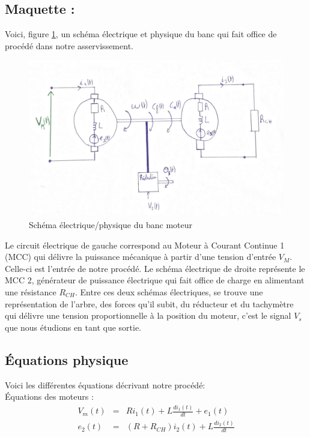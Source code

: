 \subsection{Maquette :}
Voici, figure \ref{fig:schema0}, un schéma électrique et physique du banc qui fait office de procédé dans notre asservissement.
\begin{figure}[!ht]
\centering
\includegraphics[width=.8\textwidth]{./I/images/schema0.png}
\caption{\label{fig:schema0}Schéma électrique/physique du banc moteur}
\end{figure}
Le circuit électrique de gauche correspond au Moteur à Courant Continue 1 (MCC) qui délivre la puissance mécanique à partir d'une tension d'entrée $V_M$. Celle-ci est l'entrée de notre procédé. Le schéma électrique de droite représente le MCC 2, générateur de puissance électrique qui fait office de charge en alimentant une résistance $R_{CH}$. Entre ces deux schémas électriques, se trouve une représentation de l'arbre, des forces qu'il subit, du réducteur et du tachymètre qui délivre une tension proportionnelle à la position du moteur, c'est le signal $V_s$ que nous étudions en tant que sortie. 

\subsection{Équations physique}
Voici les différentes équations décrivant notre procédé:\\
\noindent\hspace{3mm}\textbullet  \hspace{1mm} Équations des moteurs :
\begin{eqnarray}
V_m(t)  					&=& 	R i_1(t) + L \frac{d   i_1(t)}{d t} + e_1(t) \\
e_2(t) 						&=& 	(R+R_{CH}) i_2(t) + L \frac{d i_2(t)}{d t}
\end{eqnarray}


